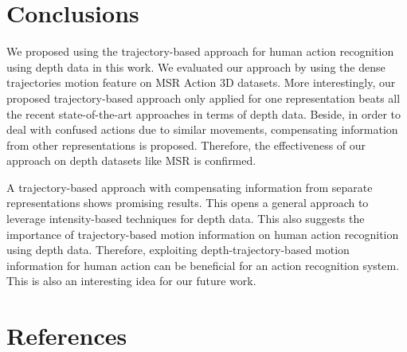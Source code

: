 \documentclass[review]{elsarticle}
\begin{document}
\section{Conclusions}

We proposed using the trajectory-based approach for human action recognition using depth data in this work. We evaluated our approach by using the dense trajectories motion feature on MSR Action 3D datasets. More interestingly, our proposed trajectory-based approach only applied for one representation beats all the recent state-of-the-art approaches in terms of depth data. Beside, in order to deal with confused actions due to similar movements, compensating information from other representations is proposed. Therefore, the effectiveness of our approach on depth datasets like MSR is confirmed.

A trajectory-based approach with compensating information from separate representations shows promising results. This opens a general approach to leverage intensity-based techniques for depth data. This also suggests the importance of trajectory-based motion information on human action recognition using depth data. Therefore, exploiting depth-trajectory-based motion information for human action can be beneficial for an action recognition system. This is also an interesting idea for our future work.

\section*{References}



\end{document}

